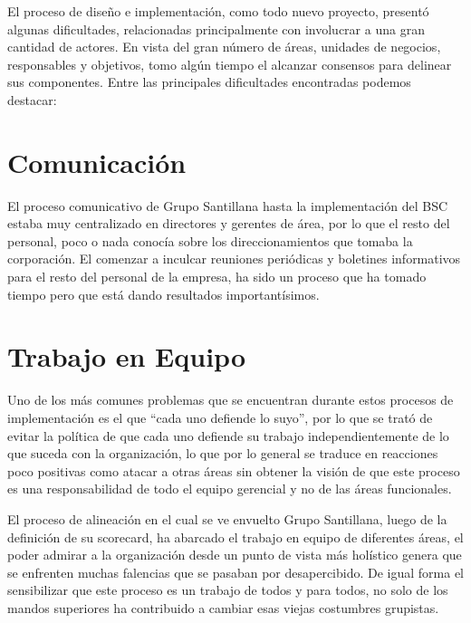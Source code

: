 \item {El proceso de diseño e implementación, como todo nuevo proyecto, presentó algunas dificultades, relacionadas principalmente con involucrar a una gran cantidad de actores. En vista del gran número de áreas, unidades de negocios, responsables y objetivos, tomo algún tiempo el alcanzar consensos para delinear sus componentes. Entre las principales dificultades encontradas podemos destacar:}

\section{Comunicación}
\item {El proceso comunicativo de Grupo Santillana hasta la implementación del BSC estaba muy centralizado en directores y gerentes de área, por lo que el resto del personal, poco o nada conocía sobre los direccionamientos que tomaba la corporación. El comenzar a inculcar reuniones periódicas y boletines informativos para el resto del personal de la empresa, ha sido un proceso que ha tomado tiempo pero que está dando resultados importantísimos.}

\section{Trabajo en Equipo}
\item {Uno de los más comunes problemas que se encuentran durante estos procesos de implementación es el que “cada uno defiende lo suyo”, por lo que se trató de evitar la política de que cada uno defiende su trabajo independientemente de lo que suceda con la organización, lo que por lo general se traduce en reacciones poco positivas como atacar a otras áreas sin obtener la visión de que este proceso es una responsabilidad de todo el equipo gerencial y no de las áreas funcionales.

El proceso de alineación en el cual se ve envuelto Grupo Santillana, luego de la definición de su scorecard,  ha abarcado el trabajo en equipo de diferentes áreas, el poder admirar a la organización desde un punto de vista más holístico genera que se enfrenten muchas falencias que se pasaban por desapercibido. De igual forma el sensibilizar que este proceso es un trabajo de todos y para todos, no solo de los mandos superiores ha contribuido a cambiar esas viejas costumbres grupistas.}

